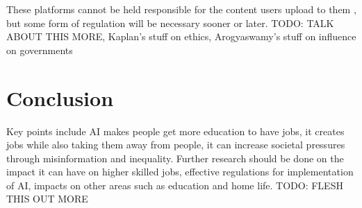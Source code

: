 \documentclass[12pt, man]{apa6}
\begin{document}
These platforms cannot be held responsible for the content users upload to them \parencite{Arogyaswamy2020}, but some form of regulation will be necessary sooner or later.  TODO: TALK ABOUT THIS MORE, Kaplan's stuff on ethics, Arogyaswamy's stuff on influence on governments

\section{Conclusion}
Key points include AI makes people get more education to have jobs, it creates jobs while also taking them away from people, it can increase societal pressures through misinformation and inequality.  Further research should be done on the impact it can have on higher skilled jobs, effective regulations for implementation of AI, impacts on other areas such as education and home life.  TODO: FLESH THIS OUT MORE




\printbibliography
\end{document}
